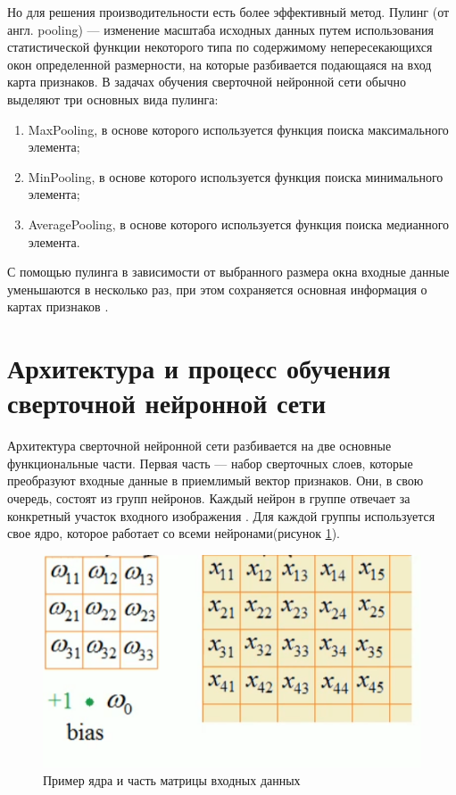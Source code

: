 Но для решения производительности есть более эффективный метод. Пулинг (от англ. pooling) --- изменение масштаба исходных данных путем использования статистической функции некоторого типа по содержимому непересекающихся окон определенной размерности, на которые разбивается подающаяся на вход карта признаков. В задачах обучения сверточной нейронной сети обычно выделяют три основных вида пулинга:
\begin{enumerate}
    \item [1)] MaxPooling, в основе которого используется функция поиска максимального элемента;
    \item [2)] MinPooling, в основе которого используется  функция поиска минимального элемента;
    \item [3)] AveragePooling, в основе которого используется функция поиска медианного элемента.
\end{enumerate}

С помощью пулинга в зависимости от выбранного размера окна входные данные уменьшаются в несколько раз, при этом сохраняется основная информация о картах признаков \cite{19,26}.
\section{Архитектура и процесс обучения сверточной нейронной сети}

Архитектура сверточной нейронной сети разбивается на две основные функциональные части. Первая часть --- набор сверточных слоев, которые преобразуют входные данные в приемлимый вектор признаков. Они, в свою очередь, состоят из групп нейронов. Каждый нейрон в группе отвечает за конкретный участок входного изображения \cite{18,21}. Для каждой группы используется свое ядро, которое работает со всеми нейронами(рисунок \ref{fig:2}).
\begin{figure}[ht] 
  \center
  \includegraphics [scale=0.9] {img/conv.png}
  \caption{Пример ядра и часть матрицы входных данных} 
  \label{fig:2}  
\end{figure}

